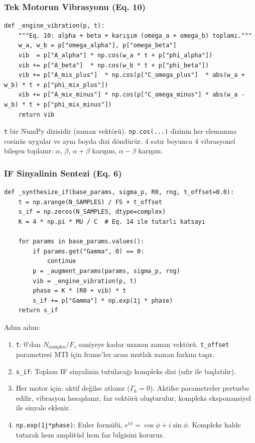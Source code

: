 \documentclass[11pt,a4paper]{article}
\begin{document}
\subsubsection{Tek Motorun Vibrasyonu (Eq. 10)}
\begin{lstlisting}[caption={Eq. 10 — alpha + beta + iki karışım terimi}]
def _engine_vibration(p, t):
    """Eq. 10: alpha + beta + karışım (omega_a + omega_b) toplamı."""
    w_a, w_b = p["omega_alpha"], p["omega_beta"]
    vib  = p["A_alpha"] * np.cos(w_a * t + p["phi_alpha"])
    vib += p["A_beta"]  * np.cos(w_b * t + p["phi_beta"])
    vib += p["A_mix_plus"]  * np.cos(p["C_omega_plus"]  * abs(w_a + w_b) * t + p["phi_mix_plus"])
    vib += p["A_mix_minus"] * np.cos(p["C_omega_minus"] * abs(w_a - w_b) * t + p["phi_mix_minus"])
    return vib
\end{lstlisting}
\texttt{t} bir NumPy dizisidir (zaman vektörü). \texttt{np.cos(...)} dizinin her elemanına cosinüs
uygular ve aynı boyda dizi döndürür. 4 satır boyunca 4 vibrasyonel bileşen toplanır:
$\alpha$, $\beta$, $\alpha+\beta$ karışım, $\alpha-\beta$ karışım.

\subsubsection{IF Sinyalinin Sentezi (Eq. 6)}
\begin{lstlisting}[caption={Eq. 6 — FMCW IF sinyali sentezi}]
def _synthesize_if(base_params, sigma_p, R0, rng, t_offset=0.0):
    t = np.arange(N_SAMPLES) / FS + t_offset
    s_if = np.zeros(N_SAMPLES, dtype=complex)
    K = 4 * np.pi * MU / C  # Eq. 14 ile tutarlı katsayı

    for params in base_params.values():
        if params.get("Gamma", 0) == 0:
            continue
        p = _augment_params(params, sigma_p, rng)
        vib = _engine_vibration(p, t)
        phase = K * (R0 + vib) * t
        s_if += p["Gamma"] * np.exp(1j * phase)
    return s_if
\end{lstlisting}
Adım adım:
\begin{enumerate}
    \item \texttt{t}: 0'dan $N_{\text{samples}}/F_s$ saniyeye kadar uzanan zaman vektörü.
          \texttt{t\_offset} parametresi MTI için frame'ler arası mutlak zaman farkını taşır.
    \item \texttt{s\_if}: Toplam IF sinyalinin tutulacağı kompleks dizi (sıfır ile başlatılır).
    \item Her motor için: aktif değilse atlanır ($\Gamma_k = 0$). Aktifse parametreler perturbe edilir,
          vibrasyon hesaplanır, faz vektörü oluşturulur, kompleks eksponansiyel ile sinyale eklenir.
    \item \texttt{np.exp(1j*phase)}: Euler formülü, $e^{i\phi} = \cos\phi + i\sin\phi$. Kompleks halde
          tutarak hem amplitüd hem faz bilgisini koruruz.
\end{enumerate}
\end{document}
